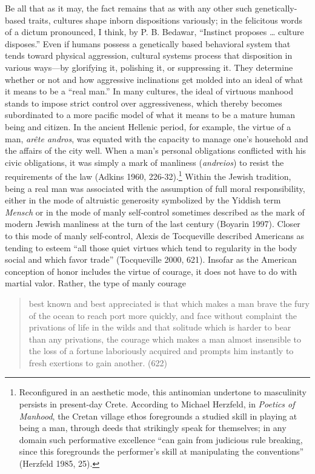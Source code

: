 Be all that as it may, the fact remains that as with any other such genetically-based traits, cultures shape inborn dispositions variously; in the felicitous words of a dictum pronounced, I think, by P. B. Bedawar, ``Instinct proposes \ldots{} culture disposes.'' Even if humans possess a genetically based behavioral system that tends toward physical aggression, cultural systems process that disposition in various ways---by glorifying it, polishing it, or suppressing it. They determine whether or not and how aggressive inclinations get molded into an ideal of what it means to be a ``real man.'' In many cultures, the ideal of virtuous manhood stands to impose strict control over aggressiveness, which thereby becomes subordinated to a more pacific model of what it means to be a mature human being and citizen. In the ancient Hellenic period, for example, the virtue of a man, \emph{ar\^{e}te andros}, was equated with the capacity to manage one's household and the affairs of the city well. When a man's personal obligations conflicted with his civic obligations, it was simply a mark of manliness (\emph{andreios}) to resist the requirements of the law (Adkins 1960, 226-32).\footnote{Reconfigured in an aesthetic mode, this antinomian undertone to masculinity persists in present-day Crete.  According to Michael Herzfeld, in \emph{Poetics of Manhood}, the Cretan village ethos foregrounds a studied skill in playing at being a man, through deeds that strikingly speak for themselves; in any domain such performative excellence ``can gain from judicious rule breaking, since this foregrounds the performer's skill at manipulating the conventions'' (Herzfeld 1985, 25).} Within the Jewish tradition, being a real man was associated with the assumption of full moral responsibility, either in the mode of altruistic generosity symbolized by the Yiddish term \emph{Mensch} or in the mode of manly self-control sometimes described as the mark of modern Jewish manliness at the turn of the last century (Boyarin 1997). Closer to this mode of manly self-control, Alexis de Tocqueville described Americans as tending to esteem ``all those quiet virtues which tend to regularity in the body social and which favor trade'' (Tocqueville 2000, 621). Insofar as the American conception of honor includes the virtue of courage, it does not have to do with martial valor. Rather, the type of manly courage

\begin{quote}
best known and best appreciated is that which makes a man brave the fury of the ocean to reach port more quickly, and face without complaint the privations of life in the wilds and that solitude which is harder to bear than any privations, the courage which makes a man almost insensible to the loss of a fortune laboriously acquired and prompts him instantly to fresh exertions to gain another. (622)
\end{quote}

